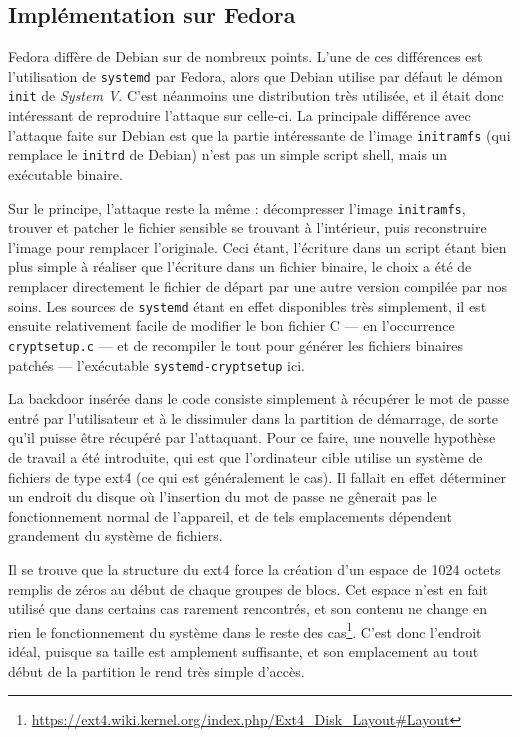 \documentclass[12pt,a4paper]{article}
\begin{document}
\subsection{Implémentation sur Fedora}

Fedora diffère de Debian sur de nombreux points. L'une de ces différences est l'utilisation de \texttt{systemd} par Fedora, alors que Debian utilise par défaut le démon \texttt{init} de \textit{System V}. C'est néanmoins une distribution très utilisée, et il était donc intéressant de reproduire l'attaque sur celle-ci. La principale différence avec l'attaque faite sur Debian est que la partie intéressante de l'image \texttt{initramfs} (qui remplace le \texttt{initrd} de Debian) n'est pas un simple script shell, mais un exécutable binaire.

Sur le principe, l'attaque reste la même : décompresser l'image \texttt{initramfs}, trouver et patcher le fichier sensible se trouvant à l'intérieur, puis reconstruire l'image pour remplacer l'originale. Ceci étant, l'écriture dans un script étant bien plus simple à réaliser que l'écriture dans un fichier binaire, le choix a été de remplacer directement le fichier de départ par une autre version compilée par nos soins. Les sources de \texttt{systemd} étant en effet disponibles très simplement, il est ensuite relativement facile de modifier le bon fichier C --- en l'occurrence \texttt{cryptsetup.c} --- et de recompiler le tout pour générer les fichiers binaires patchés --- l'exécutable \texttt{systemd-cryptsetup} ici.

La backdoor insérée dans le code consiste simplement à récupérer le mot de passe entré par l'utilisateur et à le dissimuler dans la partition de démarrage, de sorte qu'il puisse être récupéré par l'attaquant. Pour ce faire, une nouvelle hypothèse de travail a été introduite, qui est que l'ordinateur cible utilise un système de fichiers de type ext4 (ce qui est généralement le cas). Il fallait en effet déterminer un endroit du disque où l'insertion du mot de passe ne gênerait pas le fonctionnement normal de l'appareil, et de tels emplacements dépendent grandement du système de fichiers.

Il se trouve que la structure du ext4 force la création d'un espace de 1024 octets remplis de zéros au début de chaque groupes de blocs. Cet espace n'est en fait utilisé que dans certains cas rarement rencontrés, et son contenu ne change en rien le fonctionnement du système dans le reste des cas\footnote{\url{https://ext4.wiki.kernel.org/index.php/Ext4\_Disk\_Layout\#Layout}}. C'est donc l'endroit idéal, puisque sa taille est amplement suffisante, et son emplacement au tout début de la partition le rend très simple d'accès.
\end{document}
